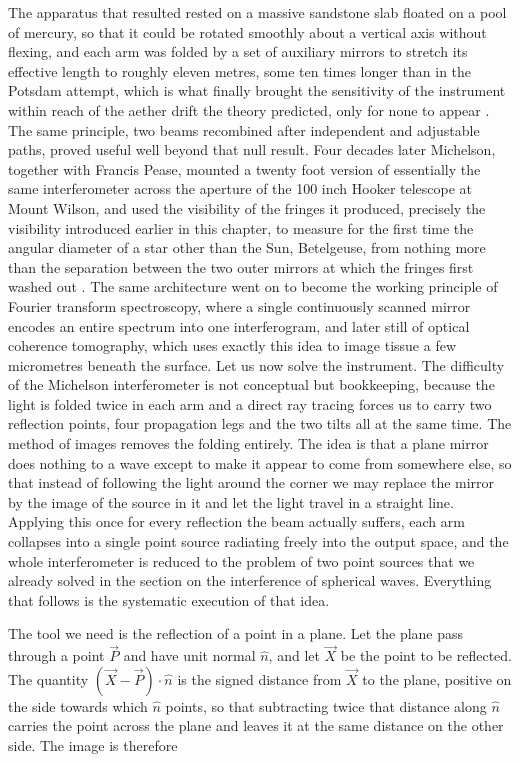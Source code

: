         The apparatus that resulted rested on a massive sandstone slab floated on a pool of mercury, so that it could be rotated smoothly about a vertical axis without flexing, and each arm was folded by a set of auxiliary mirrors to stretch its effective length to roughly eleven metres, some ten times longer than in the Potsdam attempt, which is what finally brought the sensitivity of the instrument within reach of the aether drift the theory predicted, only for none to appear \cite{michelson1887relative}. The same principle, two beams recombined after independent and adjustable paths, proved useful well beyond that null result. Four decades later Michelson, together with Francis Pease, mounted a twenty foot version of essentially the same interferometer across the aperture of the 100 inch Hooker telescope at Mount Wilson, and used the visibility of the fringes it produced, precisely the visibility introduced earlier in this chapter, to measure for the first time the angular diameter of a star other than the Sun, Betelgeuse, from nothing more than the separation between the two outer mirrors at which the fringes first washed out \cite{michelson1921diameter}. The same architecture went on to become the working principle of Fourier transform spectroscopy, where a single continuously scanned mirror encodes an entire spectrum into one interferogram, and later still of optical coherence tomography, which uses exactly this idea to image tissue a few micrometres beneath the surface.
        Let us now solve the instrument. The difficulty of the Michelson interferometer is not conceptual but bookkeeping, because the light is folded twice in each arm and a direct ray tracing forces us to carry two reflection points, four propagation legs and the two tilts all at the same time. The method of images removes the folding entirely. The idea is that a plane mirror does nothing to a wave except to make it appear to come from somewhere else, so that instead of following the light around the corner we may replace the mirror by the image of the source in it and let the light travel in a straight line. Applying this once for every reflection the beam actually suffers, each arm collapses into a single point source radiating freely into the output space, and the whole interferometer is reduced to the problem of two point sources that we already solved in the section on the interference of spherical waves. Everything that follows is the systematic execution of that idea.

        The tool we need is the reflection of a point in a plane. Let the plane pass through a point $\vec{P}$ and have unit normal $\hat{n}$, and let $\vec{X}$ be the point to be reflected. The quantity $\left(\vec{X}-\vec{P}\right)\cdot\hat{n}$ is the signed distance from $\vec{X}$ to the plane, positive on the side towards which $\hat{n}$ points, so that subtracting twice that distance along $\hat{n}$ carries the point across the plane and leaves it at the same distance on the other side. The image is therefore

